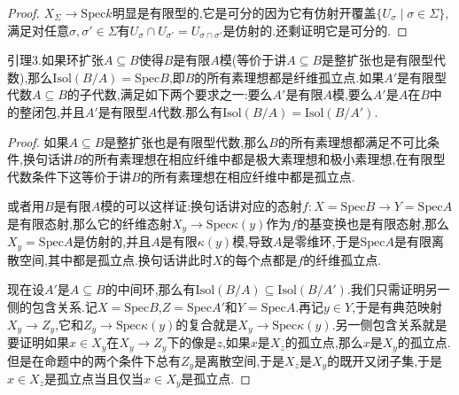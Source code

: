 \begin{enumerate}
\begin{proof}
		$X_{\Sigma}\to\mathrm{Spec}k$明显是有限型的,它是可分的因为它有仿射开覆盖$\{U_{\sigma}\mid\sigma\in\Sigma\}$,满足对任意$\sigma,\sigma'\in\Sigma$有$U_{\sigma}\cap U_{\sigma'}=U_{\sigma\cap\sigma'}$是仿射的.还剩证明它是可分的.
		
		
	\end{proof}
	
\end{enumerate}











\item 引理3.如果环扩张$A\subseteq B$使得$B$是有限$A$模(等价于讲$A\subseteq B$是整扩张也是有限型代数),那么$\mathrm{Isol}(B/A)=\mathrm{Spec}B$,即$B$的所有素理想都是纤维孤立点.如果$A'$是有限型代数$A\subseteq B$的子代数,满足如下两个要求之一:要么$A'$是有限$A$模,要么$A'$是$A$在$B$中的整闭包,并且$A'$是有限型$A$代数.那么有$\mathrm{Isol}(B/A)=\mathrm{Isol}(B/A')$.
\begin{proof}
	
	如果$A\subseteq B$是整扩张也是有限型代数,那么$B$的所有素理想都满足不可比条件,换句话讲$B$的所有素理想在相应纤维中都是极大素理想和极小素理想,在有限型代数条件下这等价于讲$B$的所有素理想在相应纤维中都是孤立点.
	
	\qquad
	
	或者用$B$是有限$A$模的可以这样证:换句话讲对应的态射$f:X=\mathrm{Spec}B\to Y=\mathrm{Spec}A$是有限态射,那么它的纤维态射$X_y\to\mathrm{Spec}\kappa(y)$作为$f$的基变换也是有限态射,那么$X_y=\mathrm{Spec}A$是仿射的,并且$A$是有限$\kappa(y)$模,导致$A$是零维环,于是$\mathrm{Spec}A$是有限离散空间,其中都是孤立点.换句话讲此时$X$的每个点都是$f$的纤维孤立点.
	
	\qquad
	
	现在设$A'$是$A\subseteq B$的中间环,那么有$\mathrm{Isol}(B/A)\subseteq\mathrm{Isol}(B/A')$.我们只需证明另一侧的包含关系.记$X=\mathrm{Spec}B$,$Z=\mathrm{Spec}A'$和$Y=\mathrm{Spec}A$.再记$y\in Y$,于是有典范映射$X_y\to Z_y$,它和$Z_y\to\mathrm{Spec}\kappa(y)$的复合就是$X_y\to\mathrm{Spec}\kappa(y)$.另一侧包含关系就是要证明如果$x\in X_y$在$X_y\to Z_y$下的像是$z$,如果$x$是$X_z$的孤立点,那么$x$是$X_y$的孤立点.但是在命题中的两个条件下总有$Z_y$是离散空间,于是$X_z$是$X_y$的既开又闭子集,于是$x\in X_z$是孤立点当且仅当$x\in X_y$是孤立点.
\end{proof}


